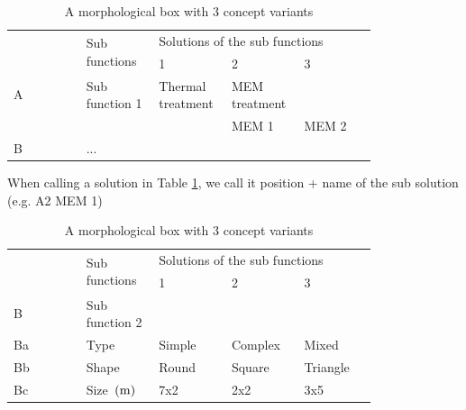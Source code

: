 \begin{table}[ht]
	\centering
	\begin{tabular}{lp{0.2\linewidth}p{0.2\linewidth}p{0.2\linewidth}p{0.2\linewidth}}\toprule
		\multirow{2}{*}{} & \multirow{2}{*}{Sub functions} & \multicolumn{3}{l}{Solutions of the sub functions}\\\cmidrule{3-5}
		& & 1 & 2 & 3\\
		\midrule
		A & Sub function 1 & Thermal treatment & MEM treatment & \\
		&  &   & MEM 1  & MEM 2 \\
		B & ... &  &  &   \\\bottomrule
	\end{tabular}
	\caption{A morphological box with 3 concept variants}
	\label{subsub1}
\end{table}
When calling a solution in Table \ref{subsub1}, we call it position + name of the sub solution (e.g. A2 MEM 1)
\begin{table}[ht]
	\centering
	\begin{tabular}{lp{0.2\linewidth}p{0.2\linewidth}p{0.2\linewidth}p{0.2\linewidth}}\toprule
		\multirow{2}{*}{} & \multirow{2}{*}{Sub functions} & \multicolumn{3}{l}{Solutions of the sub functions}\\\cmidrule{3-5}
		& & 1 & 2 & 3\\
		\midrule
		B & Sub function 2 & & & \\
		Ba & Type  &  Simple & Complex  & Mixed \\
		Bb & Shape & Round & Square & Triangle  \\
		Bc & Size $ \, (\mathrm{m}) $  & 7x2 & 2x2 & 3x5 \\\bottomrule
	\end{tabular}
	\caption{A morphological box with 3 concept variants}
	\label{subsub2}
\end{table}

